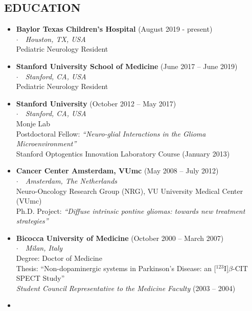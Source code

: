 \documentclass[line,margin]{res}
\newcommand{\superscript}[1]{\ensuremath{^{\textrm{#1}}}}
\newcommand{\titlestyle}[1]{{\bf #1}}
\newcommand{\placestyle}[1]{\footnotesize $\cdot$\ \ {\emph{#1}}}
\newcommand{\datestyle}[1]{{\tiny \dotfill} {\small (#1)}}
\begin{document}
\begin{resume}
\vspace{15pt}
\section{EDUCATION}
\begin{itemize}
\item {
  \titlestyle{Baylor Texas Children's Hospital} \datestyle{August 2019 - present} \\
  { \placestyle{Houston, TX, USA} } \\
  Pediatric Neurology Resident
}
\item {
  \titlestyle{Stanford University School of Medicine} \datestyle{June 2017 -- June 2019} \\
  { \placestyle{Stanford, CA, USA} } \\
  Pediatric Neurology Resident
}
\item {
  \titlestyle{Stanford University} \datestyle{October 2012 -- May 2017} \\
  { \placestyle{Stanford, CA, USA} } \\
  Monje Lab \\
  Postdoctoral Fellow: \emph{``Neuro-glial Interactions in the Glioma Microenvironment''} \\
  Stanford Optogentics Innovation Laboratory Course \datestyle{January 2013}
}
\item {
  \titlestyle{Cancer Center Amsterdam, VUmc} \datestyle{May 2008 -- July 2012} \\
  { \placestyle{Amsterdam, The Netherlands} } \\
  Neuro-Oncology Research Group (NRG), VU University Medical Center (VUmc) \\
  Ph.D. Project: \emph{``Diffuse intrinsic pontine gliomas: towards new treatment strategies''}
}
\item {
  \titlestyle{Bicocca University of Medicine} \datestyle{October 2000 -- March 2007} \\
  { \placestyle{Milan, Italy} } \\
  Degree: Doctor of Medicine \\
  Thesis: {\small ``Non-dopaminergic systems in Parkinson's Disease: an [\superscript{123}I]$\beta$-CIT SPECT Study''} \\
  \emph{Student Council Representative to the Medicine Faculty} \datestyle{2003 -- 2004}
}
\item {
}
\end{itemize}
\end{resume}
\end{document}
